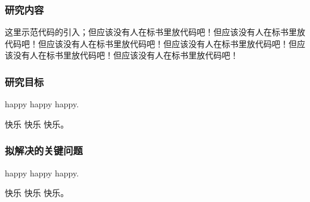 
\justifying

\subsubsection{研究内容}

\indent\setlength{\parindent}{2em}%

这里示范代码的引入；但应该没有人在标书里放代码吧！但应该没有人在标书里放代码吧！但应该没有人在标书里放代码吧！但应该没有人在标书里放代码吧！但应该没有人在标书里放代码吧！但应该没有人在标书里放代码吧！



\subsubsection{研究目标}

\indent\setlength{\parindent}{2em}%

happy happy happy.

快乐 快乐 快乐。

\subsubsection{拟解决的关键问题}

\indent\setlength{\parindent}{2em}%

happy happy happy.

快乐 快乐 快乐。

\clearpage